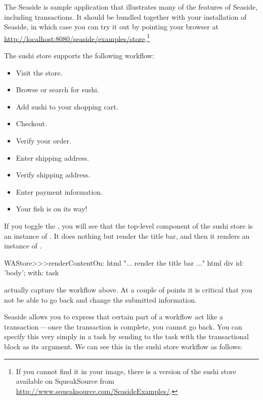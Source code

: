 \documentclass[a4paper,10pt,twoside]{book}
\begin{document}
The Seaside  is sample application that illustrates many of the features of Seaside, including transactions.
It should be bundled together with your installation of Seaside, in which case you can try it out by pointing your browser at
\url{http://localhost:8080/seaside/examples/store}.\footnote{If you cannot find it in your image, there is a version of the sushi store available on SqueakSource from \url{http://www.squeaksource.com/SeasideExamples/}.}

The sushi store supports the following workflow:
\begin{itemize}
  \item Visit the store.
  \item Browse or search for sushi.
  \item Add sushi to your shopping cart.
  \item Checkout.
  \item Verify your order.
  \item Enter shipping address.
  \item Verify shipping address.
  \item Enter payment information.
  \item Your fish is on its way!
\end{itemize}

If you toggle the , you will see that the top-level component of the sushi store is an instance of .
It does nothing but render the title bar, and then it renders an instance of .

\begin{code}{}
WAStore>>>renderContentOn: html
	"... render the title bar ..."
	html div id: 'body'; with: task
\end{code}

 actually capture the workflow above.
At a couple of points it is critical that you not be able to go back and change the submitted information.


Seaside allows you to express that certain part of a workflow act like a transaction\,---\,once the transaction is complete, you cannot go back.
You can specify this very simply in a task by sending  to the task with the transactional block as its argument.
We can see this in the sushi store workflow as follows:
\end{document}
